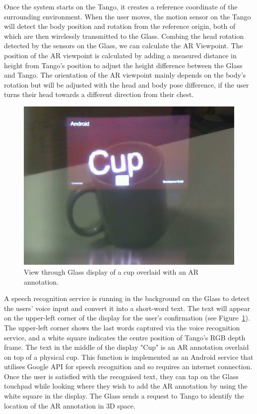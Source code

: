 Once the system starts on the Tango, it creates a reference coordinate of the surrounding environment. When the user moves, the motion sensor on the Tango will detect the body position and rotation from the reference origin, both of which are then wirelessly transmitted to the Glass. Combing the head rotation detected by the sensors on the Glass, we can calculate the AR Viewpoint. The position of the AR viewpoint is calculated by adding a measured distance in height from Tango's position to adjust the height difference between the Glass and Tango. The orientation of the AR viewpoint mainly depends on the body's rotation but will be adjusted with the head and body pose difference, if the user turns their head towards a different direction from their chest. 

\begin{figure}[ht]
  \centering
  \includegraphics[width=0.8\linewidth]{images/mgia15/WIN_20150614_204531_2.jpg}
  \caption{View through Glass display of a cup overlaid with an AR annotation.}
  \label{fig:mgia15:ui}
\end{figure}

A speech recognition service is running in the background on the Glass to detect the users' voice input and convert it into a short-word text. The text will appear on the upper-left corner of the display for the user's confirmation (see Figure~\ref{fig:mgia15:ui}). The upper-left corner shows the last words captured via the voice recognition service, and a white square indicates the centre position of Tango's RGB depth frame. The text in the middle of the display "Cup" is an AR annotation overlaid on top of a physical cup. This function is implemented as an Android service that utilises Google API for speech recognition and so requires an internet connection. Once the user is satisfied with the recognised text, they can tap on the Glass touchpad while looking where they wish to add the AR annotation by using the white square in the display. The Glass sends a request to Tango to identify the location of the AR annotation in 3D space.

